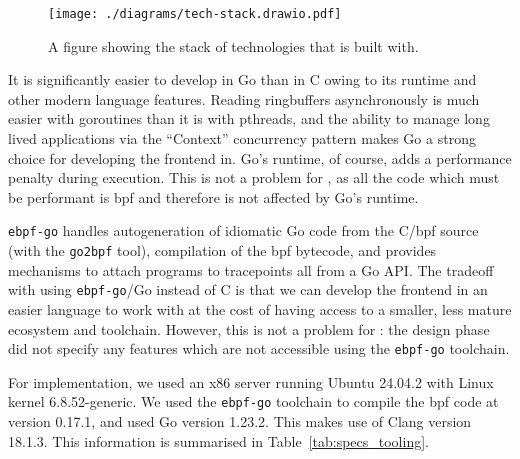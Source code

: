 \begin{figure}[ht]
    \centering
    \texttt{[image: ./diagrams/tech-stack.drawio.pdf]} 
    \caption{A figure showing the stack of technologies that \af is built with.}
    \label{fig:tech-stack}
\end{figure}

It is significantly easier to develop in Go than in C owing to its runtime and other 
modern language features. Reading ringbuffers asynchronously is much easier with 
goroutines than it is with pthreads, and the ability to manage long lived applications 
via the  ``Context'' concurrency pattern makes Go a strong choice for developing the 
frontend in. Go's runtime, of course, adds a performance penalty during execution. This  is not a problem for \afss, as all the code which must be performant is \ac{bpf} 
and therefore is not affected by Go's runtime. 

\texttt{ebpf-go} handles autogeneration of idiomatic Go code from the C/\ac{bpf}
source (with the \texttt{go2bpf} tool),
compilation of the \ac{bpf} bytecode, and provides mechanisms to attach programs
to tracepoints all from a Go API. The tradeoff with using
\texttt{ebpf-go}/Go instead of C is that we can develop the frontend in an
easier language to work with at the cost of having access to a smaller, less
mature ecosystem and toolchain. However, this is not a problem for \afss: the
design phase did not specify any features which are not accessible using the
\texttt{ebpf-go} toolchain. 

For implementation, we used an x86 server running Ubuntu 24.04.2 with Linux
kernel 6.8.52-generic. We used the \texttt{ebpf-go} toolchain to compile the
\ac{bpf} code at version 0.17.1, and used Go version 1.23.2. This makes use of
Clang version 18.1.3. This information is summarised in
Table~\ref{tab:specs_tooling}.

